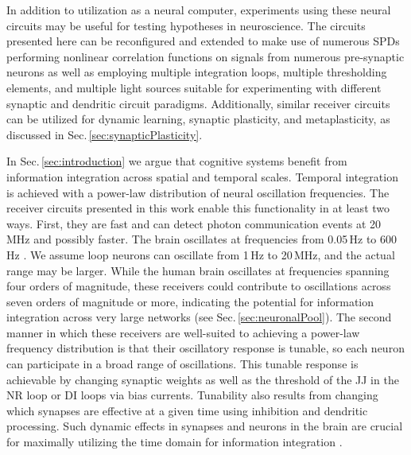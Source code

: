 \documentclass[twocolumn]{article}
\begin{document}
In addition to utilization as a neural computer, experiments using these neural circuits may be useful for testing hypotheses in neuroscience. The circuits presented here can be reconfigured and extended to make use of numerous SPDs performing nonlinear correlation functions on signals from numerous pre-synaptic neurons as well as employing multiple integration loops, multiple thresholding elements, and multiple light sources suitable for experimenting with different synaptic and dendritic circuit paradigms. Additionally, similar receiver circuits can be utilized for dynamic learning, synaptic plasticity, and metaplasticity, as discussed in Sec.\,\ref{sec:synapticPlasticity}.

In Sec.\,\ref{sec:introduction} we argue that cognitive systems benefit from information integration across spatial and temporal scales. Temporal integration is achieved with a power-law distribution of neural oscillation frequencies. The receiver circuits presented in this work enable this functionality in at least two ways. First, they are fast and can detect photon communication events at 20 MHz and possibly faster. The brain oscillates at frequencies from 0.05\,Hz to 600\,Hz \cite{budr2004}. We assume loop neurons can oscillate from 1\,Hz to 20\,MHz, and the actual range may be larger. While the human brain oscillates at frequencies spanning four orders of magnitude, these receivers could contribute to oscillations across seven orders of magnitude or more, indicating the potential for information integration across very large networks \cite{stsa2000} (see Sec.\,\ref{sec:neuronalPool}). The second manner in which these receivers are well-suited to achieving a power-law frequency distribution is that their oscillatory response is tunable, so each neuron can participate in a broad range of oscillations. This tunable response is achievable by changing synaptic weights as well as the threshold of the JJ in the NR loop or DI loops via bias currents. Tunability also results from changing which synapses are effective at a given time using inhibition and dendritic processing. Such dynamic effects in synapses and neurons in the brain are crucial for maximally utilizing the time domain for information integration \cite{bu2006}.
\end{document}

